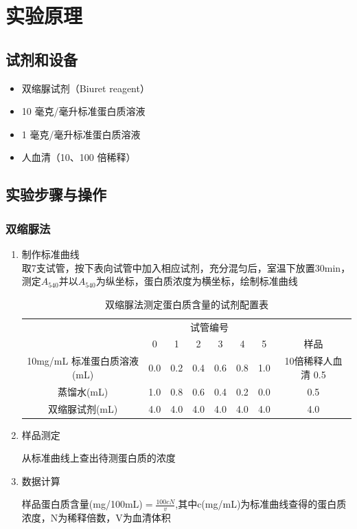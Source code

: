 \documentclass[UTF8]{ctexart}
\begin{document}
\section{实验原理}

\subsection{试剂和设备}
\begin{itemize}
    \item 双缩脲试剂（Biuret reagent）
    \item 10 毫克/毫升标准蛋白质溶液
    \item 1 毫克/毫升标准蛋白质溶液
    \item 人血清（10、100 倍稀释）
\end{itemize}

\subsection{实验步骤与操作}
\subsubsection{双缩脲法}
\begin{enumerate}
    \item 制作标准曲线 \\
    取7支试管，按下表向试管中加入相应试剂，充分混匀后，室温下放置30min，测定$A_{540}$并以$A_{540}$为纵坐标，蛋白质浓度为横坐标，绘制标准曲线 \\
    \begin{table}[H]
        \centering
        \caption{双缩脲法测定蛋白质含量的试剂配置表}
        \begin{tabular}{cccccccc}
        \toprule
        & \multicolumn{6}{c}{试管编号} \\
        \cmidrule{2-7} 
        & 0 & 1 & 2 & 3 & 4 & 5 & 样品 \\
        \midrule
        10mg/mL 标准蛋白质溶液(mL) & 0.0 & 0.2 & 0.4 & 0.6 & 0.8 & 1.0 & 10倍稀释人血清 0.5 \\
        蒸馏水(mL) & 1.0 & 0.8 & 0.6 & 0.4 & 0.2 & 0.0 & 0.5 \\
        双缩脲试剂(mL) & 4.0 & 4.0 & 4.0 & 4.0 & 4.0 & 4.0 & 4.0\\
        \bottomrule
        \end{tabular}
    \end{table}
    \item 样品测定
    
  从标准曲线上查出待测蛋白质的浓度

    \item 数据计算
    
    样品蛋白质含量(mg/100mL)$=\frac{100cN}{v}$,其中c(mg/mL)为标准曲线查得的蛋白质浓度，N为稀释倍数，V为血清体积
    
\end{enumerate}
\end{document}

